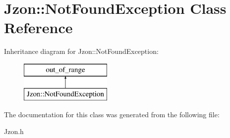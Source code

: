 \hypertarget{class_jzon_1_1_not_found_exception}{\section{Jzon\-:\-:Not\-Found\-Exception Class Reference}
\label{class_jzon_1_1_not_found_exception}
}
Inheritance diagram for Jzon\-:\-:Not\-Found\-Exception\-:\begin{figure}[H]
\begin{center}
\leavevmode
\includegraphics[height=2.000000cm]{class_jzon_1_1_not_found_exception}
\end{center}
\end{figure}


The documentation for this class was generated from the following file\-:\begin{DoxyCompactItemize}
\item 
Jzon.\-h\end{DoxyCompactItemize}
